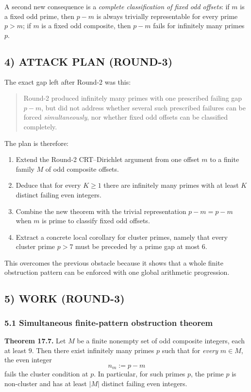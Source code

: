 A second new consequence is a \emph{complete classification of fixed odd offsets}: if $m$ is a fixed odd prime, then $p-m$ is always trivially representable for every prime $p>m$; if $m$ is a fixed odd composite, then $p-m$ fails for infinitely many primes $p$.

\subsection*{4) ATTACK PLAN (ROUND-3)}

The exact gap left after Round-2 was this:
\begin{quote}
Round-2 produced infinitely many primes with one prescribed failing gap $p-m$, but did not address whether several such prescribed failures can be forced \emph{simultaneously}, nor whether fixed odd offsets can be classified completely.
\end{quote}

The plan is therefore:
\begin{enumerate}
\item Extend the Round-2 CRT--Dirichlet argument from one offset $m$ to a finite family $M$ of odd composite offsets.
\item Deduce that for every $K\ge 1$ there are infinitely many primes with at least $K$ distinct failing even integers.
\item Combine the new theorem with the trivial representation $p-m=p-m$ when $m$ is prime to classify fixed odd offsets.
\item Extract a concrete local corollary for cluster primes, namely that every cluster prime $p>7$ must be preceded by a prime gap at most $6$.
\end{enumerate}

This overcomes the previous obstacle because it shows that a whole finite obstruction pattern can be enforced with one global arithmetic progression.

\subsection*{5) WORK (ROUND-3)}

\subsubsection*{5.1 Simultaneous finite-pattern obstruction theorem}

\textbf{Theorem 17.7.}
Let $M$ be a finite nonempty set of odd composite integers, each at least $9$. Then there exist infinitely many primes $p$ such that for \emph{every} $m\in M$, the even integer
\[
n_m:=p-m
\]
fails the cluster condition at $p$. In particular, for such primes $p$, the prime $p$ is non-cluster and has at least $|M|$ distinct failing even integers.

